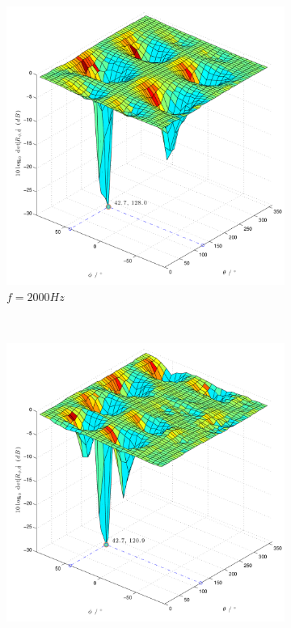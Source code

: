 \begin{figure}
\begin{subfigure}[b]{0.48\textwidth}
                \includegraphics[width=\textwidth]{grafiken/02_Konzeptionierung/Sim_sine_f_2000_Phi_45_Theta_120_dB_SNR_100dB}
                \caption{$f=2000Hz$}
                \label{fig:Sim_sine_f_2000_Phi_45_Theta_120_dB_SNR_100dB}
        \end{subfigure}
        ~ %
        \begin{subfigure}[b]{0.48\textwidth}
                \centering
                \includegraphics[width=\textwidth]{grafiken/02_Konzeptionierung/Sim_sine_f_3000_Phi_45_Theta_120_dB_SNR_100dB}

\end{subfigure}
\end{figure}
